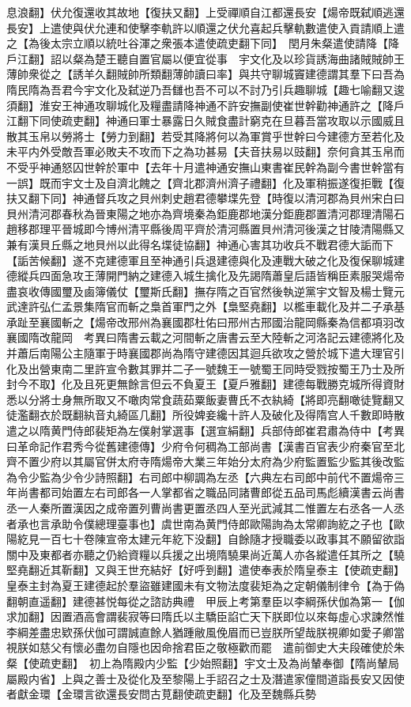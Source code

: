 息浪翻】伏允復還收其故地【復扶又翻】上受禪順自江都還長安【煬帝既弑順逃還長安】上遣使與伏允連和使擊李軌許以順還之伏允喜起兵擊軌數遣使入貢請順上遣之【為後太宗立順以統吐谷渾之衆張本遣使疏吏翻下同】　閏月朱粲遣使請降【降戶江翻】詔以粲為楚王聽自置官屬以便宜從事　宇文化及以珍貨誘海曲諸賊賊帥王薄帥衆從之【誘羊久翻賊帥所類翻薄帥讀曰率】與共守聊城竇建德謂其羣下曰吾為隋民隋為吾君今宇文化及弑逆乃吾讎也吾不可以不討乃引兵趣聊城【趣七喻翻又逡須翻】淮安王神通攻聊城化及糧盡請降神通不許安撫副使崔世幹勸神通許之【降戶江翻下同使疏吏翻】神通曰軍士暴露日久賊食盡計窮克在旦暮吾當攻取以示國威且散其玉帛以勞將士【勞力到翻】若受其降將何以為軍賞乎世幹曰今建德方至若化及未平内外受敵吾軍必敗夫不攻而下之為功甚易【夫音扶易以豉翻】奈何貪其玉帛而不受乎神通怒囚世幹於軍中【去年十月遣神通安撫山東書崔民幹為副今書世幹當有一誤】既而宇文士及自濟北餽之【齊北郡濟州濟子禮翻】化及軍稍振遂復拒戰【復扶又翻下同】神通督兵攻之貝州刺史趙君德攀堞先登【時復以清河郡為貝州宋白曰貝州清河郡春秋為晉東陽之地亦為齊境秦為鉅鹿郡地漢分鉅鹿郡置清河郡理清陽石趙移郡理平晉城即今博州清平縣後周平齊於清河縣置貝州清河後漢之甘陵清陽縣又兼有漢貝丘縣之地貝州以此得名堞徒協翻】神通心害其功收兵不戰君德大詬而下【詬苦候翻】遂不克建德軍且至神通引兵退建德與化及連戰大破之化及復保聊城建德縱兵四面急攻王薄開門納之建德入城生擒化及先謁隋蕭皇后語皆稱臣素服哭煬帝盡哀收傳國璽及鹵簿儀仗【璽斯氏翻】撫存隋之百官然後執逆黨宇文智及楊士覽元武達許弘仁孟景集隋官而斬之梟首軍門之外【梟堅堯翻】以檻車載化及并二子承基承趾至襄國斬之【煬帝改邢州為襄國郡杜佑曰邢州古邢國治龍岡縣秦為信都項羽改襄國隋改龍岡　考異曰隋書云載之河間斬之唐書云至大陸斬之河洛記云建德將化及并蕭后南陽公主隨軍于時襄國郡尚為隋守建德因其迴兵欲攻之營於城下遣大理官引化及出營東南二里許宣令數其罪并二子一號魏王一號蜀王同時受戮按蜀王乃士及所封今不取】化及且死更無餘言但云不負夏王【夏戶雅翻】建德每戰勝克城所得資財悉以分將士身無所取又不噉肉常食蔬茹粟飯妻曹氏不衣紈綺【將即亮翻噉徒覽翻又徒濫翻衣於既翻紈音丸綺區几翻】所役婢妾纔十許人及破化及得隋宫人千數即時散遣之以隋黄門侍郎裴矩為左僕射掌選事【選宣絹翻】兵部侍郎崔君肅為侍中【考異曰革命記作君秀今從舊建德傳】少府令何稠為工部尚書【漢書百官表少府秦官至北齊不置少府以其屬官併太府寺隋煬帝大業三年始分太府為少府監置監少監其後改監為令少監為少令少詩照翻】右司郎中柳調為左丞【六典左右司郎中前代不置煬帝三年尚書都司始置左右司郎各一人掌都省之職品同諸曹郎從五品司馬彪續漢書云尚書丞一人秦所置漢因之成帝置列曹尚書更置丞四人至光武減其二惟置左右丞各一人丞者承也言承助令僕總理臺事也】虞世南為黄門侍郎歐陽詢為太常卿詢紇之子也【歐陽紇見一百七十卷陳宣帝太建元年紇下没翻】自餘隨才授職委以政事其不願留欲詣關中及東都者亦聽之仍給資糧以兵援之出境隋驍果尚近萬人亦各縱遣任其所之【驍堅堯翻近其靳翻】又與王世充結好【好呼到翻】遣使奉表於隋皇泰主【使疏吏翻】皇泰主封為夏王建德起於羣盜雖建國未有文物法度裴矩為之定朝儀制律令【為于偽翻朝直遥翻】建德甚悦每從之諮訪典禮　甲辰上考第羣臣以李綱孫伏伽為第一【伽求加翻】因置酒高會謂裴寂等曰隋氏以主驕臣諂亡天下朕即位以來每虛心求諫然惟李綱差盡忠欵孫伏伽可謂誠直餘人猶踵敝風俛眉而已豈朕所望哉朕視卿如愛子卿當視朕如慈父有懷必盡勿自隱也因命捨君臣之敬極歡而罷　遣前御史大夫段確使於朱粲【使疏吏翻】　初上為隋殿内少監【少始照翻】宇文士及為尚輦奉御【隋尚輦局屬殿内省】上與之善士及從化及至黎陽上手詔召之士及潛遣家僮間道詣長安又因使者獻金環【金環言欲還長安問古莧翻使疏吏翻】化及至魏縣兵勢
